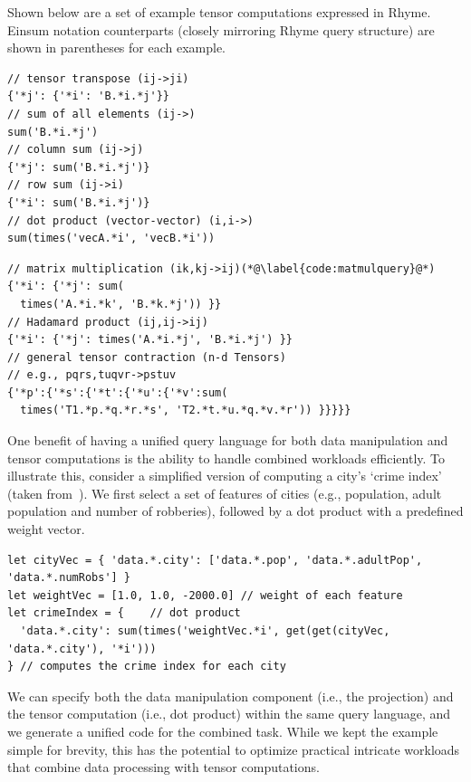 \documentclass[runningheads]{llncs}
\newcommand{\lang}{Rhyme}
\begin{document}
Shown below are a set of example tensor computations expressed in \lang{}.
Einsum notation counterparts (closely mirroring \lang{} query structure) 
are shown in parentheses for each example.

\hspace{-18pt}
\begin{minipage}{0.5\textwidth}
\begin{lstlisting}[style=JavaScript,columns=flexible]
// tensor transpose (ij->ji)
{'*j': {'*i': 'B.*i.*j'}}
// sum of all elements (ij->)
sum('B.*i.*j')
// column sum (ij->j)
{'*j': sum('B.*i.*j')}
// row sum (ij->i)
{'*i': sum('B.*i.*j')}
// dot product (vector-vector) (i,i->)
sum(times('vecA.*i', 'vecB.*i'))
\end{lstlisting}
\end{minipage}%
\begin{minipage}{0.5\textwidth}
\begin{lstlisting}[style=JavaScript,columns=flexible]
// matrix multiplication (ik,kj->ij)(*@\label{code:matmulquery}@*)
{'*i': {'*j': sum(
  times('A.*i.*k', 'B.*k.*j')) }}
// Hadamard product (ij,ij->ij)
{'*i': {'*j': times('A.*i.*j', 'B.*i.*j') }}
// general tensor contraction (n-d Tensors)
// e.g., pqrs,tuqvr->pstuv
{'*p':{'*s':{'*t':{'*u':{'*v':sum(
  times('T1.*p.*q.*r.*s', 'T2.*t.*u.*q.*v.*r')) }}}}}
\end{lstlisting}
\end{minipage}

One benefit of having a unified query language for both data manipulation and tensor
computations is the ability to handle combined workloads efficiently.
To illustrate this, consider a simplified version of computing a city's
`crime index' (taken from~\cite{weld}).
We first select a set of features of cities (e.g., population, 
adult population and number of robberies), followed by a dot product
with a predefined weight vector.

\begin{lstlisting}[style=JavaScript,columns=flexible]
let cityVec = { 'data.*.city': ['data.*.pop', 'data.*.adultPop', 'data.*.numRobs'] }
let weightVec = [1.0, 1.0, -2000.0] // weight of each feature
let crimeIndex = {    // dot product
  'data.*.city': sum(times('weightVec.*i', get(get(cityVec, 'data.*.city'), '*i')))
} // computes the crime index for each city
\end{lstlisting}

We can specify both the data manipulation component (i.e., the projection) and
the tensor computation (i.e., dot product) within the same query language, and
we generate a unified code for the combined task.
While we kept the example simple for brevity, this has the potential to optimize practical
intricate workloads that combine data processing with tensor computations.
\end{document}
